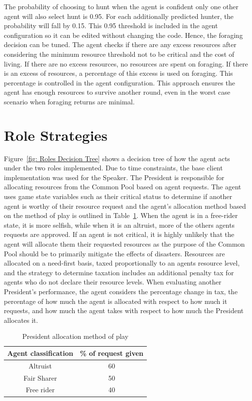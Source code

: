 The probability of choosing to hunt when the agent is confident only one other agent will also select hunt is 0.95. For each additionally predicted hunter, the probability will fall by 0.15. This 0.95 threshold is included in the agent configuration so it can be edited without changing the code. Hence, the foraging decision can be tuned. The agent checks if there are any excess resources after considering the minimum resource threshold not to be critical and the cost of living. If there are no excess resources, no resources are spent on foraging. If there is an excess of resources, a percentage of this excess is used on foraging. This percentage is controlled in the agent configuration. This approach ensures the agent has enough resources to survive another round, even in the worst case scenario when foraging returns are minimal.

\section{Role Strategies}

Figure~\ref{fig: Roles Decision Tree} shows a decision tree of how the agent acts under the two roles implemented. Due to time constraints, the base client implementation was used for the Speaker. The President is responsible for allocating resources from the Common Pool based on agent requests. The agent uses game state variables such as their critical status to determine if another agent is worthy of their resource request and the agent's allocation method based on the method of play is outlined in Table~\ref{tab:President allocation method of play}. When the agent is in a free-rider state, it is more selfish, while when it is an altruist, more of the others agents requests are approved. If an agent is not critical, it is highly unlikely that the agent will allocate them their requested resources as the purpose of the Common Pool should be to primarily mitigate the effects of disasters. Resources are allocated on a need-first basis, taxed proportionally to an agents resource level, and the strategy to determine taxation includes an additional penalty tax for agents who do not declare their resource levels. When evaluating another President's performance, the agent considers the percentage change in tax, the percentage of how much the agent is allocated with respect to how much it requests, and how much the agent takes with respect to how much the President allocates it.

\begin{table}[!htb]
\centering
\caption{President allocation method of play}
\label{tab:President allocation method of play}
\begin{tabular}{|c|c|}
\hline
\textbf{Agent classification} & \textbf{\% of request given} \\ \hline
Altruist                      & 60                           \\ \hline
Fair Sharer                   & 50                           \\ \hline
Free rider                    & 40                           \\ \hline
\end{tabular}
\end{table}

